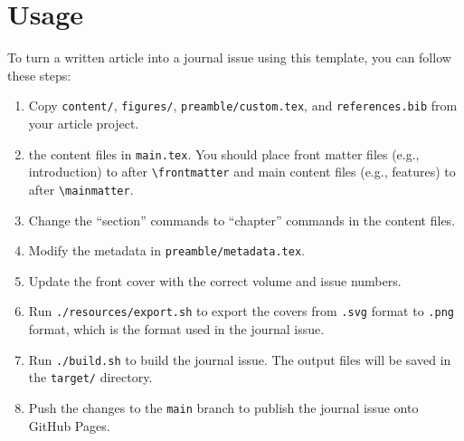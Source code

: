 \chapter{Usage}
\label{chap:usage}

To turn a written article into a journal issue using this template, you can follow these steps:

\begin{enumerate}[label=\textbf{(\arabic*)}]
  \item Copy \verb|content/|, \verb|figures/|, \verb|preamble/custom.tex|, and \verb|references.bib| from your article project.
  \item \verb|| the content files in \verb|main.tex|. You should place front matter files (e.g., introduction) to after \verb|\frontmatter| and main content files (e.g., features) to after \verb|\mainmatter|.
  \item Change the ``section'' commands to ``chapter'' commands in the content files.
  \item Modify the metadata in \verb|preamble/metadata.tex|.
  \item Update the front cover with the correct volume and issue numbers.
  \item Run \verb|./resources/export.sh| to export the covers from \verb|.svg| format to \verb|.png| format, which is the format used in the journal issue.
  \item Run \verb|./build.sh| to build the journal issue. The output files will be saved in the \verb|target/| directory.
  \item Push the changes to the \verb|main| branch to publish the journal issue onto GitHub Pages.
\end{enumerate}
